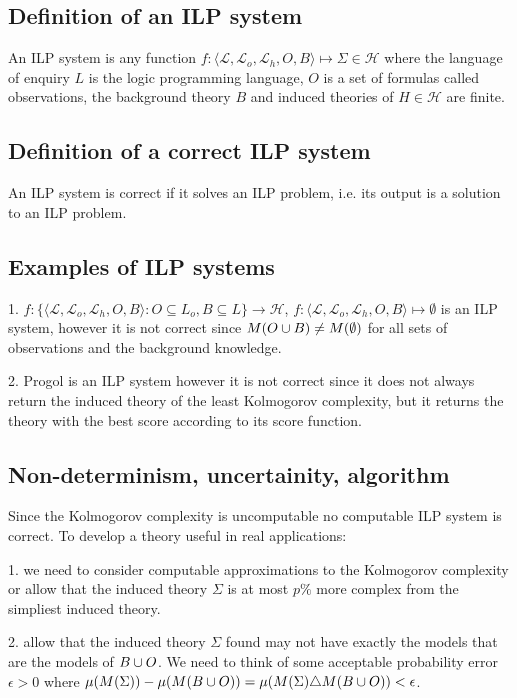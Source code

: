 \subsection{Definition of an ILP system}
An ILP system is any function $f:\langle\mathcal{L}, \mathcal{L}_o, \mathcal{L}_h, O, B\rangle \mapsto \Sigma \in \mathcal{H}$ where the language of enquiry $L$ is the logic programming language, $O$ is a set of formulas called observations, the background theory $B$ and induced theories of $H \in \mathcal{H}$ are finite.

\subsection{Definition of a correct ILP system}
An ILP system is correct if it solves an ILP problem, i.e. its output is a solution to an ILP problem.

\subsection{Examples of ILP systems}
1. $f:\{ \langle\mathcal{L}, \mathcal{L}_o, \mathcal{L}_h, O, B\rangle : O \subseteq L_o, B \subseteq L \} \to \mathcal{H}$, $f:\langle\mathcal{L}, \mathcal{L}_o, \mathcal{L}_h, O, B\rangle \mapsto \emptyset$ is an ILP system, however it is not correct since $M(O \cup B) \not= M(\emptyset)$ for all sets of observations and the background knowledge.

2. Progol is an ILP system however it is not correct since it does not always return the induced theory of the least Kolmogorov complexity, but it returns the theory with the best score according to its score function.

\subsection{Non-determinism, uncertainity, algorithm}

Since the Kolmogorov complexity is uncomputable no computable ILP system is correct. To develop a theory useful in real applications:

1. we need to consider computable approximations to the Kolmogorov complexity or allow that the induced theory $\Sigma$ is at most $p\%$ more complex from the simpliest induced theory.

2. allow that the induced theory $\Sigma$ found may not have exactly the models that are the models of $B \cup O$. We need to think of some acceptable probability error $\epsilon>0$ where $\mu(M(\Sigma))-\mu(M(B \cup O)) = \mu(M(\Sigma)  \triangle  M(B \cup O)) < \epsilon$.

